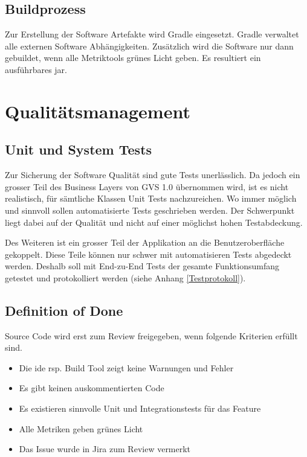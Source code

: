 \documentclass[11pt,a4paper,english,oneside]{book}
\numberwithin{equation}{chapter}
\begin{document}
	\subsection{Buildprozess}
	\label{sec:buildprocess}
	Zur Erstellung der Software Artefakte wird Gradle \cite{gradle} eingesetzt. Gradle verwaltet alle externen Software Abhängigkeiten. Zusätzlich wird die Software nur dann gebuildet, wenn alle Metriktools grünes Licht geben. Es resultiert ein ausführbares \gls{jar}.
	
	
	
	\section{Qualitätsmanagement}
	\label{sec:qualitymeasures}
	
	\subsection{Unit und System Tests}
	Zur Sicherung der Software Qualität sind gute Tests unerlässlich. Da jedoch ein grosser Teil des Business Layers von GVS 1.0 übernommen wird, ist es nicht realistisch, für sämtliche Klassen Unit Tests nachzureichen. Wo immer möglich und sinnvoll sollen automatisierte Tests geschrieben werden. Der Schwerpunkt liegt dabei auf der Qualität und nicht auf einer möglichst hohen Testabdeckung.
	
	Des Weiteren ist ein grosser Teil der Applikation an die Benutzeroberfläche gekoppelt. Diese Teile können nur schwer mit automatisieren Tests abgedeckt werden. Deshalb soll mit End-zu-End Tests der gesamte Funktionsumfang getestet und protokolliert werden (siehe Anhang \ref{Testprotokoll}).
	
	\subsection{Definition of Done} \label{ssec:dod}
	Source Code wird erst zum Review freigegeben, wenn folgende Kriterien erfüllt sind.
	\begin{itemize}
		\item Die \gls{ide} rsp. Build Tool zeigt keine Warnungen und Fehler
		\item Es gibt keinen auskommentierten Code
		\item Es existieren sinnvolle Unit und Integrationstests für das Feature
		\item Alle Metriken geben grünes Licht
		\item Das Issue wurde in Jira \cite{jira} zum Review vermerkt
	\end{itemize}
	
\end{document}
